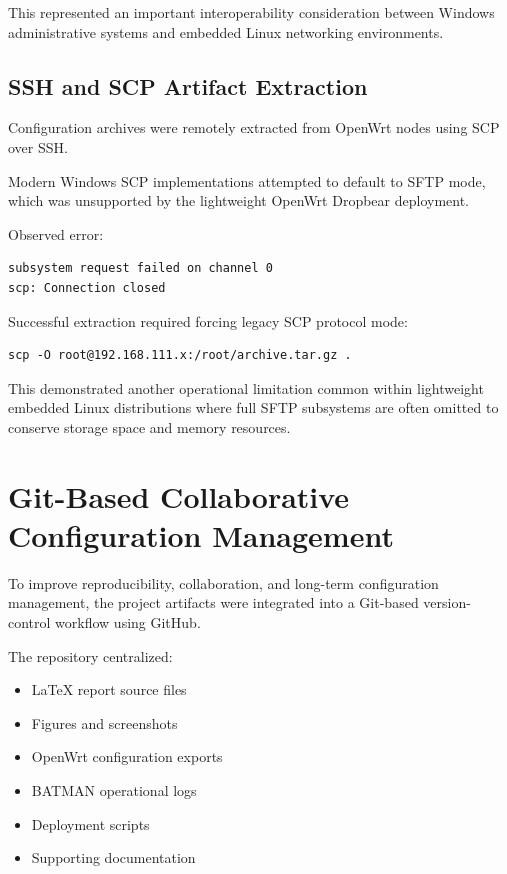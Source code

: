 \documentclass[conference]{IEEEtran}
\begin{document}
This represented an important interoperability consideration between Windows administrative systems and embedded Linux networking environments.

\subsection{SSH and SCP Artifact Extraction}

Configuration archives were remotely extracted from OpenWrt nodes using SCP over SSH.

Modern Windows SCP implementations attempted to default to SFTP mode, which was unsupported by the lightweight OpenWrt Dropbear deployment.

Observed error:

\begin{lstlisting}
subsystem request failed on channel 0
scp: Connection closed
\end{lstlisting}

Successful extraction required forcing legacy SCP protocol mode:

\begin{lstlisting}
scp -O root@192.168.111.x:/root/archive.tar.gz .
\end{lstlisting}

This demonstrated another operational limitation common within lightweight embedded Linux distributions where full SFTP subsystems are often omitted to conserve storage space and memory resources.

\section{Git-Based Collaborative Configuration Management}

To improve reproducibility, collaboration, and long-term configuration management, the project artifacts were integrated into a Git-based version-control workflow using GitHub.

The repository centralized:

\begin{itemize}
    \item LaTeX report source files
    \item Figures and screenshots
    \item OpenWrt configuration exports
    \item BATMAN operational logs
    \item Deployment scripts
    \item Supporting documentation
\end{itemize}
\end{document}
